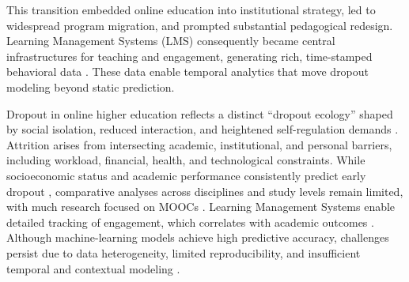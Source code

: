 This transition embedded online education into institutional strategy, led to widespread program migration, and prompted substantial pedagogical redesign. Learning Management Systems (LMS) consequently became central infrastructures for teaching and engagement, generating rich, time-stamped behavioral data \cite{Turnbull2021TransitioningELearning}. These data enable temporal analytics that move dropout modeling beyond static prediction.

Dropout in online higher education reflects a distinct ``dropout ecology'' shaped by social isolation, reduced interaction, and heightened self-regulation demands \cite{Rahmani2024OnlineDropoutReview}. Attrition arises from intersecting academic, institutional, and personal barriers, including workload, financial, health, and technological constraints. While socioeconomic status and academic performance consistently predict early dropout \cite{BarraganMoreno2024ComplexitiesDropout}, comparative analyses across disciplines and study levels remain limited, with much research focused on MOOCs \cite{Prenkaj2021SurveyMLDropout,Sghir2022PredictiveLearningAnalytics,Alalawi2023MLStudentPerformance}.
Learning Management Systems enable detailed tracking of engagement, which correlates with academic outcomes \cite{Mozahem2020LMSActivity}. Although machine-learning models achieve high predictive accuracy, challenges persist due to data heterogeneity, limited reproducibility, and insufficient temporal and contextual modeling \cite{Albreiki2021MLPerformanceReview,Schneider2010FirstYearAttrition}.

